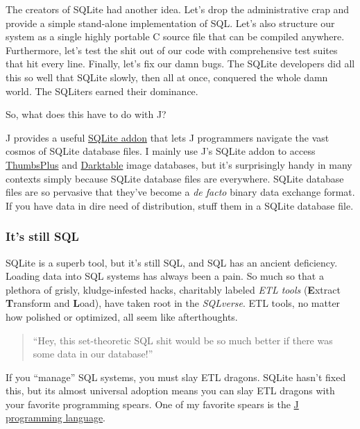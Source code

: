 The creators of SQLite had another idea. Let's drop the administrative
crap and provide a simple stand-alone implementation of SQL. Let's also
structure our system as a single highly portable C source file that can
be compiled anywhere. Furthermore, let's test the shit out of our code
with comprehensive test suites that hit every line. Finally, let's fix
our damn bugs. The SQLite developers did all this so well that SQLite
slowly, then all at once, conquered the whole damn world. The SQLiters
earned their dominance.

So, what does this have to do with J?

J provides a useful
\href{https://code.jsoftware.com/wiki/Addons/data/sqlite/Overview}{SQLite
addon} that lets J programmers navigate the vast cosmos of SQLite
database files. I mainly use J's SQLite addon to access
\href{http://www.thumbsplus.com/}{ThumbsPlus} and
\href{https://www.darktable.org/}{Darktable} image databases, but it's
surprisingly handy in many contexts simply because SQLite database files
are everywhere. SQLite database files are so pervasive that they've
become a \emph{de facto} binary data exchange format. If you have data
in dire need of distribution, stuff them in a SQLite database file.

\subsubsection*{It's still SQL}%

SQLite is a superb tool, but it's still SQL, and SQL has an ancient
deficiency. Loading data into SQL systems has always been a pain. So
much so that a plethora of grisly, kludge-infested hacks, charitably
labeled \emph{ETL tools} (\textbf{E}xtract \textbf{T}ransform and
\textbf{L}oad), have taken root in the \emph{SQLverse}. ETL tools, no
matter how polished or optimized, all seem like afterthoughts.

\begin{quote}
``Hey, this set-theoretic SQL shit would be so much better if there was
some data in our database!''
\end{quote}

If you ``manage'' SQL systems, you must slay ETL dragons. SQLite hasn't
fixed this, but its almost universal adoption means you can slay ETL
dragons with your favorite programming spears. One of my favorite spears
is the \href{https://code2.jsoftware.com/wiki/Main_Page}{J programming
language}.

